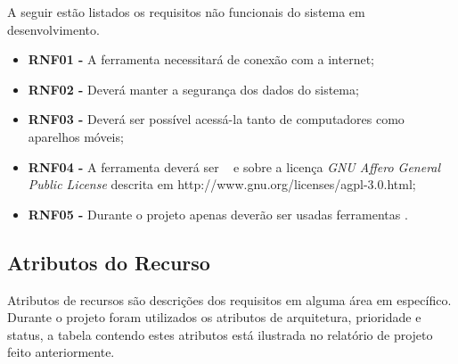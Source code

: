 A seguir estão listados os requisitos não funcionais do sistema em desenvolvimento.

\begin{itemize}
	\item \textbf{RNF01 - }A ferramenta necessitará de conexão com a internet;
	\item \textbf{RNF02 - }Deverá manter a segurança dos dados do sistema;
	\item \textbf{RNF03 - }Deverá ser possível acessá-la tanto de computadores como aparelhos móveis;
	\item \textbf{RNF04 - }A ferramenta deverá ser \opensource~ e sobre a licença \textit{GNU Affero General Public License} descrita em http://www.gnu.org/licenses/agpl-3.0.html;
	\item \textbf{RNF05 - }Durante o projeto apenas deverão ser usadas ferramentas \opensource.
\end{itemize}


\subsection{Atributos do Recurso}

Atributos de recursos são descrições dos requisitos em alguma área em específico. Durante o projeto foram utilizados os atributos de arquitetura, prioridade e status, a tabela contendo estes atributos está ilustrada no relatório de projeto feito anteriormente.